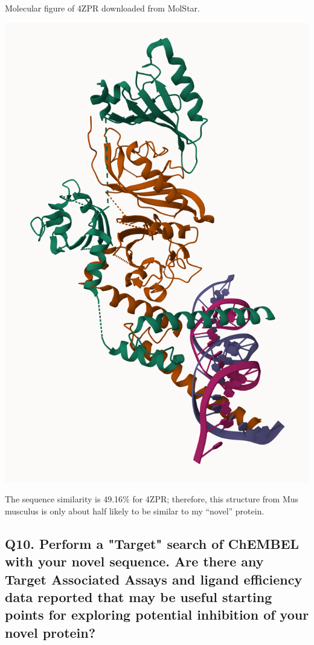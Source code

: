 \documentclass[
  letterpaper,
  DIV=11,
  numbers=noendperiod]{scrartcl}
\begin{document}
Molecular figure of 4ZPR downloaded from MolStar.

\includegraphics{images/4ZPR.png}

The sequence similarity is 49.16\% for 4ZPR; therefore, this structure
from Mus musculus is only about half likely to be similar to my
``novel'' protein.

\hypertarget{q10.-perform-a-target-search-of-chembel-with-your-novel-sequence.-are-there-any-target-associated-assays-and-ligand-efficiency-data-reported-that-may-be-useful-starting-points-for-exploring-potential-inhibition-of-your-novel-protein}{%
\subsection{\texorpdfstring{Q10. \textbf{Perform a "Target" search of
ChEMBEL with your novel sequence. Are there any Target Associated Assays
and ligand efficiency data reported that may be useful starting points
for exploring potential inhibition of your novel
protein?}}{Q10. Perform a "Target" search of ChEMBEL with your novel sequence. Are there any Target Associated Assays and ligand efficiency data reported that may be useful starting points for exploring potential inhibition of your novel protein?}}\label{q10.-perform-a-target-search-of-chembel-with-your-novel-sequence.-are-there-any-target-associated-assays-and-ligand-efficiency-data-reported-that-may-be-useful-starting-points-for-exploring-potential-inhibition-of-your-novel-protein}}
\end{document}
